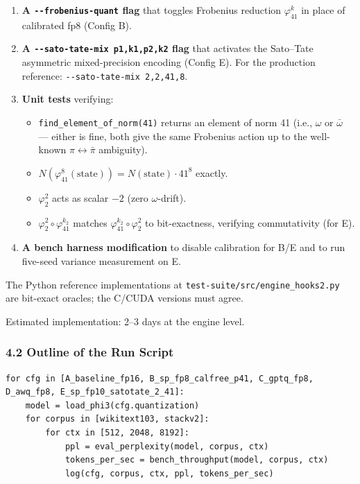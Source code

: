 \documentclass[
  11pt,
]{article}
\providecommand{\tightlist}{%
  \setlength{\itemsep}{0pt}\setlength{\parskip}{0pt}}
\begin{document}
\begin{enumerate}
\def\labelenumi{\arabic{enumi}.}
\tightlist
\item
  \textbf{A \texttt{-\/-frobenius-quant} flag} that toggles Frobenius
  reduction \(\varphi_{41}^k\) in place of calibrated fp8 (Config B).
\item
  \textbf{A \texttt{-\/-sato-tate-mix\ p1,k1,p2,k2} flag} that activates
  the Sato--Tate asymmetric mixed-precision encoding (Config E). For the
  production reference: \texttt{-\/-sato-tate-mix\ 2,2,41,8}.
\item
  \textbf{Unit tests} verifying:

  \begin{itemize}
  \tightlist
  \item
    \texttt{find\_element\_of\_norm(41)} returns an element of norm 41
    (i.e., \(\omega\) or \(\bar{\omega}\) --- either is fine, both give
    the same Frobenius action up to the well-known
    \(\pi \leftrightarrow \bar{\pi}\) ambiguity).
  \item
    \(N(\varphi_{41}^8(\text{state})) = N(\text{state}) \cdot 41^8\)
    exactly.
  \item
    \(\varphi_2^2\) acts as scalar \(-2\) (zero \(\omega\)-drift).
  \item
    \(\varphi_2^2 \circ \varphi_{41}^{k_2}\) matches
    \(\varphi_{41}^{k_2} \circ \varphi_2^2\) to bit-exactness, verifying
    commutativity (for E).
  \end{itemize}
\item
  \textbf{A bench harness modification} to disable calibration for B/E
  and to run five-seed variance measurement on E.
\end{enumerate}

The Python reference implementations at
\texttt{test-suite/src/engine\_hooks2.py} are bit-exact oracles; the
C/CUDA versions must agree.

Estimated implementation: 2--3 days at the engine level.

\hypertarget{outline-of-the-run-script}{%
\subsubsection{4.2 Outline of the Run
Script}\label{outline-of-the-run-script}}

\begin{verbatim}
for cfg in [A_baseline_fp16, B_sp_fp8_calfree_p41, C_gptq_fp8, D_awq_fp8, E_sp_fp10_satotate_2_41]:
    model = load_phi3(cfg.quantization)
    for corpus in [wikitext103, stackv2]:
        for ctx in [512, 2048, 8192]:
            ppl = eval_perplexity(model, corpus, ctx)
            tokens_per_sec = bench_throughput(model, corpus, ctx)
            log(cfg, corpus, ctx, ppl, tokens_per_sec)
\end{verbatim}
\end{document}
